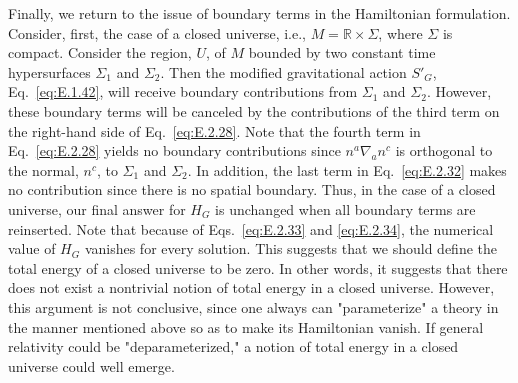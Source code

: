 Finally, we return to the issue of boundary terms in the Hamiltonian formulation.
Consider, first, the case of a closed universe, i.e., \(M=\mathbb R\times\Sigma\),
where \(\Sigma\) is compact. Consider the region, \(U\), of \(M\) bounded by two
constant time hypersurfaces \(\Sigma_1\) and \(\Sigma_2\). Then the modified
gravitational action \(S'_G\), Eq.~\eqref{eq:E.1.42}, will receive boundary
contributions from \(\Sigma_1\) and \(\Sigma_2\). However, these boundary terms
will be canceled by the contributions of the third term on the right-hand side of
Eq.~\eqref{eq:E.2.28}. Note that the fourth term in Eq.~\eqref{eq:E.2.28} yields
no boundary contributions since \(n^a\nabla_an^c\) is orthogonal to the normal,
\(n^c\), to \(\Sigma_1\) and \(\Sigma_2\). In addition, the last term in
Eq.~\eqref{eq:E.2.32} makes no contribution since there is no spatial boundary.
Thus, in the case of a closed universe, our final answer for \(H_G\) is unchanged
when all boundary terms are reinserted. Note that because of
Eqs.~\eqref{eq:E.2.33} and \eqref{eq:E.2.34}, the numerical value of \(H_G\)
vanishes for every solution. This suggests that we should define the total energy of
a closed universe to be zero. In other words, it suggests that there does not exist a
nontrivial notion of total energy in a closed universe. However, this argument is not
conclusive, since one always can "parameterize" a theory in the manner mentioned
above so as to make its Hamiltonian vanish. If general relativity could be
"deparameterized," a notion of total energy in a closed universe could well emerge.

